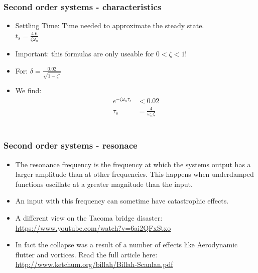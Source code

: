 \begin{frame}
\frametitle{Second order systems - characteristics}
\begin{itemize}
\item Settling Time: Time needed to approximate the steady state.
\\ $t_s = \frac{4.6}{\zeta\omega_n}$
\item Important: this formulas are only useable for $0<\zeta<1$!
\vspace{0.15cm}
\item For: $\delta = \frac{0.02}{\sqrt{1-\zeta^2}}$
\vspace{0.15cm}
\item We find:
\vspace{-0.6cm}
\begin{align*}
 e^{-\zeta\omega_n\tau_s} &< 0.02
\\\tau_s &= \frac{4}{\omega_n\zeta}
\end{align*}
\\ \begin{figure}
\end{figure}
\end{itemize}
\end{frame}

\begin{frame}
\frametitle{Second order systems - resonace}
\begin{itemize}
\item The resonance frequency is the frequency at which the systems output has a larger amplitude than at other frequencies. This happens when underdamped functions oscillate at a greater magnitude than the input.
\item An input with this frequency can sometime have catastrophic effects.
\item A different view on the Tacoma bridge disaster: \url{https://www.youtube.com/watch?v=6ai2QFxStxo}
\item In fact the collapse was a result of a number of effects like Aerodynamic flutter and vortices. Read the full article here: \url{http://www.ketchum.org/billah/Billah-Scanlan.pdf}
\end{itemize}
\end{frame}

